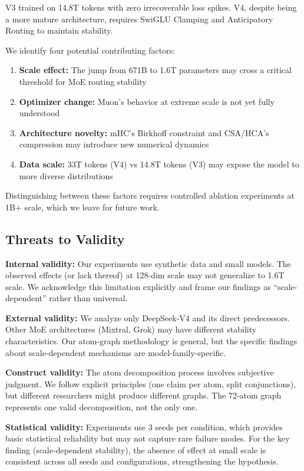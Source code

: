 \documentclass[11pt,a4paper]{article}
\begin{document}
V3 trained on 14.8T tokens with zero irrecoverable loss spikes. V4, despite being a more mature architecture, requires SwiGLU Clamping and Anticipatory Routing to maintain stability.

We identify four potential contributing factors:

\begin{enumerate}
    \item \textbf{Scale effect:} The jump from 671B to 1.6T parameters may cross a critical threshold for MoE routing stability
    \item \textbf{Optimizer change:} Muon's behavior at extreme scale is not yet fully understood
    \item \textbf{Architecture novelty:} mHC's Birkhoff constraint and CSA/HCA's compression may introduce new numerical dynamics
    \item \textbf{Data scale:} 33T tokens (V4) vs 14.8T tokens (V3) may expose the model to more diverse distributions
\end{enumerate}

Distinguishing between these factors requires controlled ablation experiments at 1B+ scale, which we leave for future work.

\subsection{Threats to Validity}

\textbf{Internal validity:} Our experiments use synthetic data and small models. The observed effects (or lack thereof) at 128-dim scale may not generalize to 1.6T scale. We acknowledge this limitation explicitly and frame our findings as ``scale-dependent'' rather than universal.

\textbf{External validity:} We analyze only DeepSeek-V4 and its direct predecessors. Other MoE architectures (Mixtral, Grok) may have different stability characteristics. Our atom-graph methodology is general, but the specific findings about scale-dependent mechanisms are model-family-specific.

\textbf{Construct validity:} The atom decomposition process involves subjective judgment. We follow explicit principles (one claim per atom, split conjunctions), but different researchers might produce different graphs. The 72-atom graph represents one valid decomposition, not the only one.

\textbf{Statistical validity:} Experiments use 3 seeds per condition, which provides basic statistical reliability but may not capture rare failure modes. For the key finding (scale-dependent stability), the absence of effect at small scale is consistent across all seeds and configurations, strengthening the hypothesis.
\end{document}
